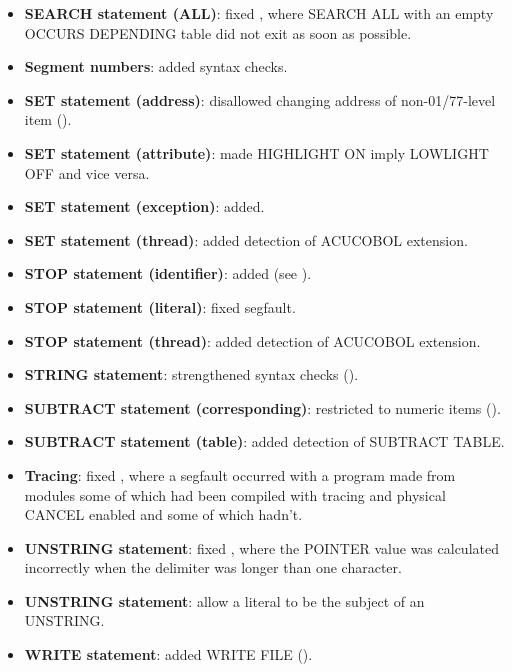 \begin{itemize}
\item \textbf{SEARCH statement (ALL)}: fixed , where SEARCH ALL with an empty OCCURS DEPENDING table did not exit as soon as possible.
\item \textbf{Segment numbers}: added syntax checks.
\item \textbf{SET statement (address)}: disallowed changing address of non-01\slash{}77-level item ().
\item \textbf{SET statement (attribute)}: made HIGHLIGHT ON imply LOWLIGHT OFF and vice versa.
\item \textbf{SET statement (exception)}: added.
\item \textbf{SET statement (thread)}: added detection of ACUCOBOL extension.
\item \textbf{STOP statement (identifier)}: added (see ).
\item \textbf{STOP statement (literal)}: fixed segfault.
\item \textbf{STOP statement (thread)}: added detection of ACUCOBOL extension.
\item \textbf{STRING statement}: strengthened syntax checks ().
\item \textbf{SUBTRACT statement (corresponding)}: restricted to numeric items ().
\item \textbf{SUBTRACT statement (table)}: added detection of SUBTRACT TABLE.
\item \textbf{Tracing}: fixed , where a segfault occurred with a program made from modules some of which had been compiled with tracing and physical CANCEL %
enabled and some of which hadn't.
\item \textbf{UNSTRING statement}: fixed , where the POINTER value was calculated incorrectly when the delimiter was longer than one character.
\item \textbf{UNSTRING statement}: allow a literal to be the subject of an UNSTRING.
\item \textbf{WRITE statement}: added WRITE FILE ().
\end{itemize}

